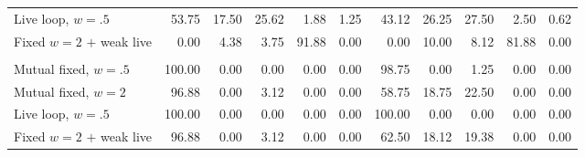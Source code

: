 \begin{table}[htbp]
\begin{tabularx}{\linewidth}{@{}Yrrrrrrrrrr@{}}
Live loop, $w=.5$ & 53.75 & 17.50 & 25.62 & 1.88 & 1.25 & 43.12 & 26.25 & 27.50 & 2.50 & 0.62 \\
Fixed $w=2$ $+$ weak live & 0.00 & 4.38 & 3.75 & 91.88 & 0.00 & 0.00 & 10.00 & 8.12 & 81.88 & 0.00 \\
\addlinespace
{} \\
Mutual fixed, $w=.5$ & 100.00 & 0.00 & 0.00 & 0.00 & 0.00 & 98.75 & 0.00 & 1.25 & 0.00 & 0.00 \\
Mutual fixed, $w=2$ & 96.88 & 0.00 & 3.12 & 0.00 & 0.00 & 58.75 & 18.75 & 22.50 & 0.00 & 0.00 \\
Live loop, $w=.5$ & 100.00 & 0.00 & 0.00 & 0.00 & 0.00 & 100.00 & 0.00 & 0.00 & 0.00 & 0.00 \\
Fixed $w=2$ $+$ weak live & 96.88 & 0.00 & 3.12 & 0.00 & 0.00 & 62.50 & 18.12 & 19.38 & 0.00 & 0.00 \\
\bottomrule
\end{tabularx}
\end{table}
